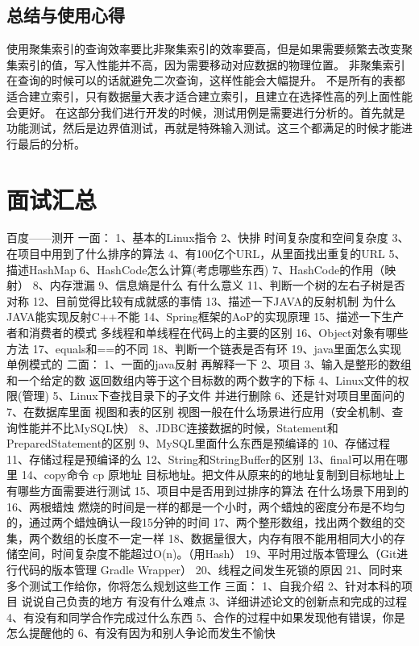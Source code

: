 \documentclass[UTF8]{ctexart}
\begin{document}
\subsection{总结与使用心得}
使用聚集索引的查询效率要比非聚集索引的效率要高，但是如果需要频繁去改变聚集索引的值，写入性能并不高，因为需要移动对应数据的物理位置。
非聚集索引在查询的时候可以的话就避免二次查询，这样性能会大幅提升。
不是所有的表都适合建立索引，只有数据量大表才适合建立索引，且建立在选择性高的列上面性能会更好。
在这部分我们进行开发的时候，测试用例是需要进行分析的。首先就是功能测试，然后是边界值测试，再就是特殊输入测试。这三个都满足的时候才能进行最后的分析。
\section{面试汇总}
百度——测开
一面：
1、基本的Linux指令
2、快排 时间复杂度和空间复杂度
3、在项目中用到了什么排序的算法
4、有100亿个URL，从里面找出重复的URL
5、描述HashMap 
6、HashCode怎么计算(考虑哪些东西)
7、HashCode的作用（映射）
8、内存泄漏
9、信息熵是什么 有什么意义
11、判断一个树的左右子树是否对称
12、目前觉得比较有成就感的事情
13、描述一下JAVA的反射机制 为什么JAVA能实现反射C++不能
14、Spring框架的AoP的实现原理
15、描述一下生产者和消费者的模式 多线程和单线程在代码上的主要的区别
16、Object对象有哪些方法
17、equals和==的不同
18、判断一个链表是否有环
19、java里面怎么实现单例模式的
二面：
1、一面的java反射 再解释一下
2、项目
3、输入是整形的数组和一个给定的数 返回数组内等于这个目标数的两个数字的下标
4、Linux文件的权限(管理)
5、Linux下查找目录下的子文件 并进行删除
6、还是针对项目里面问的
7、在数据库里面 视图和表的区别 视图一般在什么场景进行应用（安全机制、查询性能并不比MySQL快）
8、JDBC连接数据的时候，Statement和PreparedStatement的区别
9、MySQL里面什么东西是预编译的
10、存储过程
11、存储过程是预编译的么
12、String和StringBuffer的区别
13、final可以用在哪里
14、copy命令 cp 原地址 目标地址。把文件从原来的的地址复制到目标地址上 有哪些方面需要进行测试
15、项目中是否用到过排序的算法 在什么场景下用到的
16、两根蜡烛 燃烧的时间是一样的都是一个小时，两个蜡烛的密度分布是不均匀的，通过两个蜡烛确认一段15分钟的时间
17、两个整形数组，找出两个数组的交集，两个数组的长度不一定一样
18、数据量很大，内存有限不能用相同大小的存储空间，时间复杂度不能超过O(n)。（用Hash）
19、平时用过版本管理么（Git进行代码的版本管理 Gradle Wrapper）
20、线程之间发生死锁的原因
21、同时来多个测试工作给你，你将怎么规划这些工作
三面：
1、自我介绍
2、针对本科的项目 说说自己负责的地方 有没有什么难点
3、详细讲述论文的创新点和完成的过程
4、有没有和同学合作完成过什么东西
5、合作的过程中如果发现他有错误，你是怎么提醒他的
6、有没有因为和别人争论而发生不愉快
\end{document}

